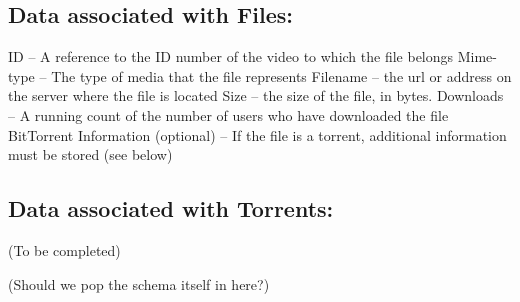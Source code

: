 \documentclass[a4paper,12pt]{report}
\begin{document}
\subsection{Data associated with Files:}
	ID – A reference to the ID number of the video to which the file belongs
	Mime-type – The type of media that the file represents
	Filename – the url or address on the server where the file is located
	Size – the size of the file, in bytes.
	Downloads – A running count of the number of users who have downloaded the 		file
	BitTorrent Information (optional) – If the file is a torrent, additional information 		must be stored (see below)

\subsection{Data associated with Torrents:}
	(To be completed)

(Should we pop the schema itself in here?)
\end{document}
